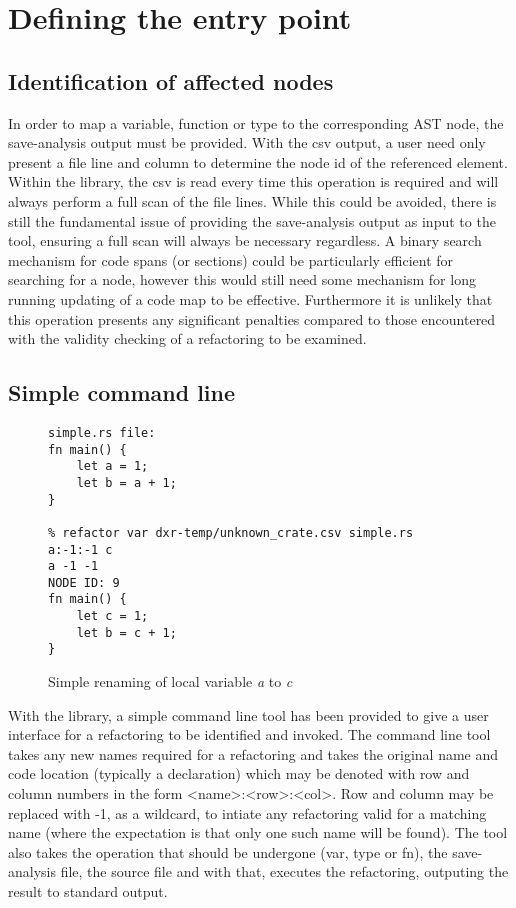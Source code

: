 
\section{Defining the entry point}\label{S:entry}
\subsection{Identification of affected nodes}
In order to map a variable, function or type to the corresponding AST node, the save-analysis output must be provided. With the csv output, a user need only present a file line and column to determine the node id of the referenced element. Within the library, the csv is read every time this operation is required and will always perform a full scan of the file lines. While this could be avoided, there is still the fundamental issue of providing the save-analysis output as input to the tool, ensuring a full scan will always be necessary regardless. A binary search mechanism for code spans (or sections) could be particularly efficient for searching for a node, however this would still need some mechanism for long running updating of a code map to be effective. Furthermore it is unlikely that this operation presents any significant penalties compared to those encountered with the validity checking of a refactoring to be examined.

\subsection{Simple command line}

\begin{figure}[H]
\centering

\begin{verbatim}
simple.rs file:
fn main() {
    let a = 1;
    let b = a + 1;
}

% refactor var dxr-temp/unknown_crate.csv simple.rs  a:-1:-1 c
a -1 -1
NODE ID: 9
fn main() {
    let c = 1;
    let b = c + 1;
}
\end{verbatim}

\caption{Simple renaming of local variable \emph{a} to \emph{c}}
\label{Fig:cmdrename}
\end{figure}


With the library, a simple command line tool has been provided to give a user interface for a refactoring to be identified and invoked. The command line tool takes any new names required for a refactoring and takes the original name and code location (typically a declaration) which may be denoted with row and column numbers in the form \textless{}name\textgreater{}:\textless{}row\textgreater{}:\textless{}col\textgreater{}. Row and column may be replaced with -1, as a wildcard, to intiate any refactoring valid for a matching name (where the expectation is that only one such name will be found). The tool also takes the operation that should be undergone (var, type or fn), the save-analysis file, the source file and with that, executes the refactoring, outputing the result to standard output.



